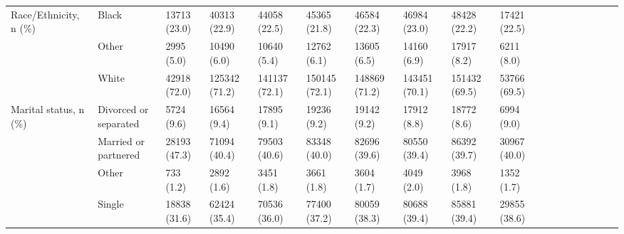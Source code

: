 \begin{tabular}{llllllllllllllllll}
Race/Ethnicity, n (\%) & Black &                 13713 (23.0) &    40313 (22.9) &    44058 (22.5) &    45365 (21.8) &    46584 (22.3) &    46984 (23.0) &    48428 (22.2) &   17421 (22.5) &                   &                    &                    &                    &                    &                     &                     &                     \\
                                       & Other &                   2995 (5.0) &     10490 (6.0) &     10640 (5.4) &     12762 (6.1) &     13605 (6.5) &     14160 (6.9) &     17917 (8.2) &     6211 (8.0) &                   &                    &                    &                    &                    &                     &                     &                     \\
                                       & White &                 42918 (72.0) &   125342 (71.2) &   141137 (72.1) &   150145 (72.1) &   148869 (71.2) &   143451 (70.1) &   151432 (69.5) &   53766 (69.5) &                   &                    &                    &                    &                    &                     &                     &                     \\
Marital status, n (\%) & Divorced or separated &                   5724 (9.6) &     16564 (9.4) &     17895 (9.1) &     19236 (9.2) &     19142 (9.2) &     17912 (8.8) &     18772 (8.6) &     6994 (9.0) &                   &                    &                    &                    &                    &                     &                     &                     \\
                                       & Married or partnered &                 28193 (47.3) &    71094 (40.4) &    79503 (40.6) &    83348 (40.0) &    82696 (39.6) &    80550 (39.4) &    86392 (39.7) &   30967 (40.0) &                   &                    &                    &                    &                    &                     &                     &                     \\
                                       & Other &                    733 (1.2) &      2892 (1.6) &      3451 (1.8) &      3661 (1.8) &      3604 (1.7) &      4049 (2.0) &      3968 (1.8) &     1352 (1.7) &                   &                    &                    &                    &                    &                     &                     &                     \\
                                       & Single &                 18838 (31.6) &    62424 (35.4) &    70536 (36.0) &    77400 (37.2) &    80059 (38.3) &    80688 (39.4) &    85881 (39.4) &   29855 (38.6) &                   &                    &                    &                    &                    &                     &                     &                     \\

\end{tabular}
